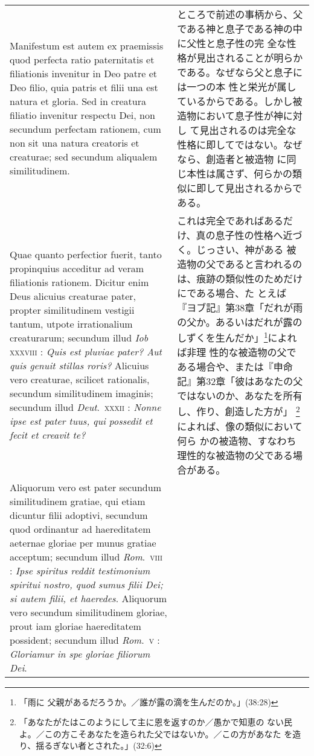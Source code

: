 \documentclass[10pt]{jsarticle} %
\begin{document}
\begin{longtable}{p{21em}p{21em}}
\\

Manifestum est autem ex praemissis quod perfecta ratio
paternitatis et filiationis invenitur in Deo patre et Deo filio, quia
patris et filii una est natura et gloria. Sed in creatura filiatio
invenitur respectu Dei, non secundum perfectam rationem, cum non sit
una natura creatoris et creaturae; sed secundum aliqualem
similitudinem. 

&

ところで前述の事柄から、父である神と息子である神の中に父性と息子性の完
 全な性格が見出されることが明らかである。なぜなら父と息子には一つの本
 性と栄光が属しているからである。しかし被造物において息子性が神に対し
 て見出されるのは完全な性格に即してではない。なぜなら、創造者と被造物
 に同じ本性は属さず、何らかの類似に即して見出されるからである。

\\

Quae quanto perfectior fuerit, tanto propinquius
acceditur ad veram filiationis rationem. Dicitur enim Deus alicuius
creaturae pater, propter similitudinem vestigii tantum, utpote
irrationalium creaturarum; secundum illud {\itshape Iob} {\scshape
 xxxviii} : {\itshape Quis est
pluviae pater? Aut quis genuit stillas roris?} Alicuius vero creaturae,
scilicet rationalis, secundum similitudinem imaginis; secundum illud
{\itshape Deut}.~{\scshape xxxii} : {\itshape Nonne ipse est pater tuus, qui possedit et fecit et
creavit te?} 

&

これは完全であればあるだけ、真の息子性の性格へ近づく。じっさい、神がある
 被造物の父であると言われるのは、痕跡の類似性のためだけにである場合、た
 とえば『ヨブ記』第38章「だれが雨の父か。あるいはだれが露のしずくを生んだか」\footnote{「雨に
 父親があるだろうか。／誰が露の滴を生んだのか。」(38:28)}によれば非理
 性的な被造物の父である場合や、または『申命記』第32章「彼はあなたの父ではないのか、あなたを所有し、作り、創造した方が」
 \footnote{「あなたがたはこのようにして主に恩を返すのか／愚かで知恵の
 ない民よ。／この方こそあなたを造られた父ではないか。／この方があなた
 を造り、揺るぎない者とされた。」(32:6)}によれば、像の類似において何ら
 かの被造物、すなわち理性的な被造物の父である場合がある。


\\


Aliquorum vero est pater secundum similitudinem gratiae,
qui etiam dicuntur filii adoptivi, secundum quod ordinantur ad
haereditatem aeternae gloriae per munus gratiae acceptum; secundum
illud {\itshape Rom}.~{\scshape viii} : {\itshape Ipse spiritus reddit testimonium spiritui nostro,
quod sumus filii Dei; si autem filii, et haeredes}. Aliquorum vero
secundum similitudinem gloriae, prout iam gloriae haereditatem
possident; secundum illud {\itshape Rom}.~{\scshape v} : {\itshape Gloriamur in spe gloriae filiorum
Dei}. 


\end{longtable}
\end{document}
